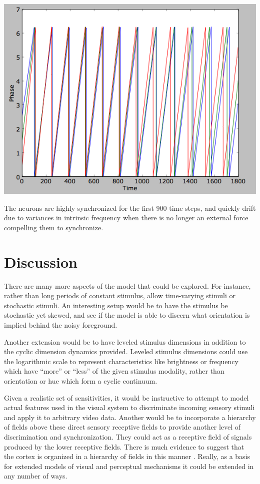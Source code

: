 \documentclass[12pt]{article}
\begin{document}
\vspace{10pt}
\includegraphics[scale=0.55]{desynchronize.png}

The neurons are highly synchronized for the first 900 time steps, and quickly drift due to variances in intrinsic frequency when there is no longer an external force compelling them to synchronize.  

\section{Discussion}

There are many more aspects of the model that could be explored.  For instance, rather than long periods of constant stimulus, allow time-varying stimuli or stochastic stimuli.  An interesting setup would be to have the stimulus be stochastic yet skewed, and see if the model is able to discern what orientation is implied behind the noisy foreground.  

Another extension would be to have leveled stimulus dimensions in addition to the cyclic dimension dynamics provided.  Leveled stimulus dimensions could use the logarithmic scale to represent characteristics like brightness or frequency which have ``more'' or ``less'' of the given stimulus modality, rather than orientation or hue which form a cyclic continuum.  

Given a realistic set of sensitivities, it would be instructive to attempt to model actual features used in the visual system to discriminate incoming sensory stimuli and apply it to arbitrary video data.  Another would be to incorporate a hierarchy of fields above these direct sensory receptive fields to provide another level of discrimination and synchronization.  They could act as a receptive field of signals produced by the lower receptive fields.  There is much evidence to suggest that the cortex is organized in a hierarchy of fields in this manner \cite{Poggio}.  Really, as a basis for extended models of visual and perceptual mechanisms it could be extended in any number of ways.
\end{document}
